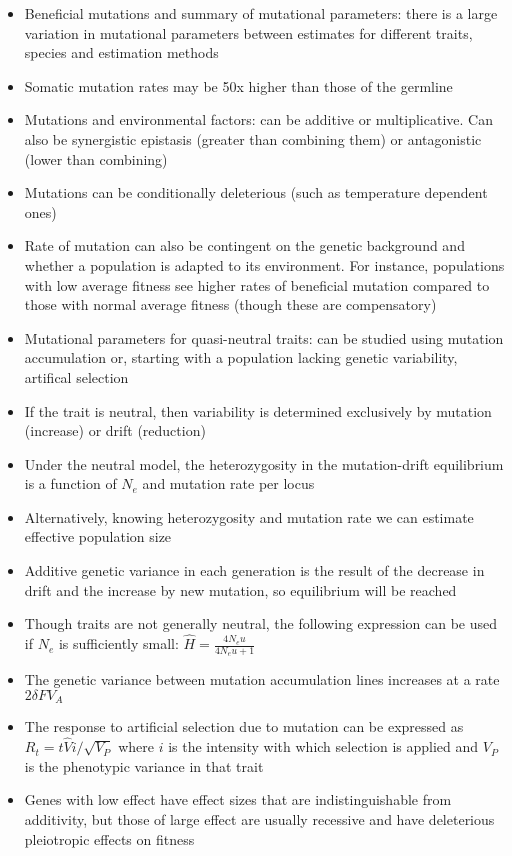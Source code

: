 \documentclass[12pt]{amsart}
\begin{document}
\begin{itemize}
\begin{itemize}
\end{itemize}
\item Beneficial mutations and summary of mutational parameters: there is a large variation in mutational parameters between estimates for different traits, species and estimation methods
\item Somatic mutation rates may be 50x higher than those of the germline
\item Mutations and environmental factors: can be additive or multiplicative. Can also be synergistic epistasis (greater than combining them) or antagonistic (lower than combining)
\item Mutations can be conditionally deleterious (such as temperature dependent ones)
\item Rate of mutation can also be contingent on the genetic background and whether a population is adapted to its environment. For instance, populations with low average fitness see higher rates of beneficial mutation compared to those with normal average fitness (though these are compensatory) 
\item Mutational parameters for quasi-neutral traits: can be studied using mutation accumulation or, starting with a population lacking genetic variability, artifical selection
\item If the trait is neutral, then variability is determined exclusively by mutation (increase) or drift (reduction) 
\item Under the neutral model, the heterozygosity in the mutation-drift equilibrium is a function of $N_e$ and mutation rate per locus
\item Alternatively, knowing heterozygosity and mutation rate we can estimate effective population size
\item Additive genetic variance in each generation is the result of the decrease in drift and the increase by new mutation, so equilibrium will be reached 
\item Though traits are not generally neutral, the following expression can be used if $N_e$ is sufficiently small: $\hat{H} = \frac{4N_eu}{4N_eu + 1}$
\item The genetic variance between mutation accumulation lines increases at a rate $2 \delta FV_A$
\item The response to artificial selection due to mutation can be expressed as $R_t = t\hat{V}i/\sqrt{V_P}$ where $i$ is the intensity with which selection is applied and $V_P$ is the phenotypic variance in that trait 
\item Genes with low effect have effect sizes that are indistinguishable from additivity, but those of large effect are usually recessive and have deleterious pleiotropic effects on fitness 

\end{itemize}
\end{document}
